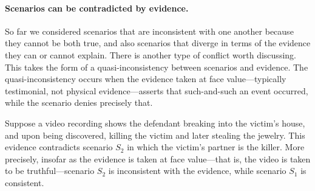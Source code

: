\documentclass[10pt]{article}
\begin{document}
\paragraph{Scenarios can be contradicted by evidence.} So far we considered scenarios that are 
inconsistent with one another because 
they cannot be both true, and also scenarios that diverge in terms of 
the evidence they can or cannot explain. There is another type of conflict worth discussing. This takes the form of 
a quasi-inconsistency between scenarios and evidence. The quasi-inconsistency occurs 
when the evidence taken at face value---typically testimonial, not physical evidence---asserts 
that such-and-such an event occurred, while the scenario 
denies precisely that. 

Suppose a video recording shows the defendant 
breaking into the victim's house, and upon being discovered, 
killing the victim and later stealing the jewelry. 
This evidence contradicts scenario $S_2$ 
in which the victim's partner is the killer. More precisely, insofar as the evidence 
is taken at face value---that is, the video is taken to be truthful---scenario $S_2$ 
is inconsistent with the evidence, while scenario $S_1$ is consistent. 

\end{document}
